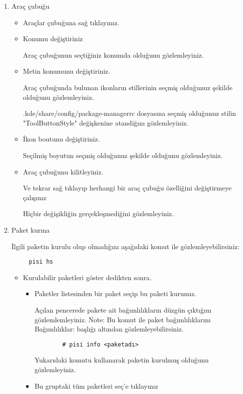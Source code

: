 \documentclass[a4paper,10pt]{article}
\begin{document}
\begin{enumerate}
    \item Araç çubuğu
    \begin{itemize}
        \item Araçlar çubuğuna sağ tıklayınız.

        \item Konumu değiştiriniz
      
	Araç çubuğunun seçtiğiniz konumda olduğunu gözlemleyiniz.
        \item Metin konumunu değiştiriniz.

	    Araç çubuğunda bulunan ikonların stillerinin seçmiş olduğunuz şekilde olduğunu gözlemleyiniz.
            
	    .kde/share/config/package-managerrc dosyasına seçmiş olduğunuz stilin "ToolButtonStyle" değişkenine atandiğını gözlemleyiniz.

        \item İkon boutunu değiştiriniz.
      
	Seçilmiş boyutun seçmiş olduğunuz şekilde olduğunu gözlemleyiniz.
        \item Araç çubuğunu kilitleyiniz.
    
            Ve tekrar sağ tıklayıp herhangi bir araç çubuğu özelliğini değiştirmeye çalışınız
	    
	    Hiçbir değişikliğin gerçekleşmediğini gözlemleyiniz.
    \end{itemize}


    \item Paket kurma
	
		
	İlgili paketin kurulu olup olmadığını aşağıdaki komut ile gözlemleyebilirsiniz:
	\begin{verbatim}
	 pisi hs
	\end{verbatim}


        \begin{itemize}
            \item Kurulabilir paketleri göster dedikten sonra. 
            \begin{itemize}
                \item Paketler listesinden bir paket seçip bu paketi kurunuz.
		
		Açılan pencerede pakete ait bağımlılıkların düzgün çıktığını gözlemlemleyiniz.	
	 	Note: Bu komut ile paket bağımlılıklarını Bağımlılıklar: başlığı altından gözlemleyebilirsiniz.
		\begin{verbatim}
		# pisi info <paketadı>
		\end{verbatim}
		Yukarıdaki komutu kullanarak paketin kurulmuş olduğunu gözlemleyiniz.
                \item Bu gruptaki tüm paketleri seç'e tıklayınız 


\end{itemize}
\end{itemize}
\end{enumerate}
\end{document}
